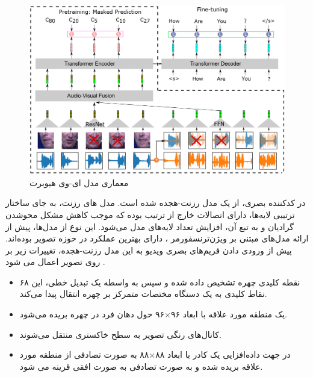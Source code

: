 \begin{figure}[!h]
	\centering
	\captionsetup{justification=centering}
	\includegraphics[width=\textwidth]{images/av-hubert-model}
	\caption[معماری مدل ای-وی هیوبرت]{معماری مدل ای-وی هیوبرت \cite{shi2022robust}}
	\label{fig:av-hubert-model}
\end{figure}

در کدکننده بصری، از یک مدل رزنت-هجده 
شده است. مدل های رزنت، به جای ساختار ترتیبی لایه‌ها، دارای اتصالات خارج از ترتیب بوده که موجب کاهش مشکل محوشدن گرادیان
و به تبع آن، افزایش تعداد لایه‌های مدل می‌شود. این نوع از مدل‌ها، پیش از ارائه مدل‌های مبتنی بر ویژن‌ترنسفورمر
، دارای بهترین عملکرد در حوزه تصویر بوده‌اند. پیش از ورودی دادن فریم‌های بصری ویدیو به این مدل رزنت-هجده، تغییرات زیر بر روی تصویر اعمال می شود
\cite{shi2022learning}
.

\begin{itemize}
	\item ۶۸ نقطه کلیدی چهره تشخیص داده شده و سپس به واسطه یک تبدیل خطی، این نقاط کلیدی به یک دستگاه مختصات متمرکز بر چهره انتقال پیدا می‌کند.
	\item یک منطقه مورد علاقه
	با ابعاد ۹۶×۹۶ حول دهان فرد در چهره بریده می‌شود.
	\item کانال‌های رنگی تصویر به سطح خاکستری منتقل می‌شوند.
	\item در جهت داده‌افزایی
	یک کادر با ابعاد ۸۸×۸۸ به صورت تصادفی از منطقه مورد علاقه بریده شده و به صورت تصادفی به صورت افقی قرینه
	می شود.
\end{itemize}

